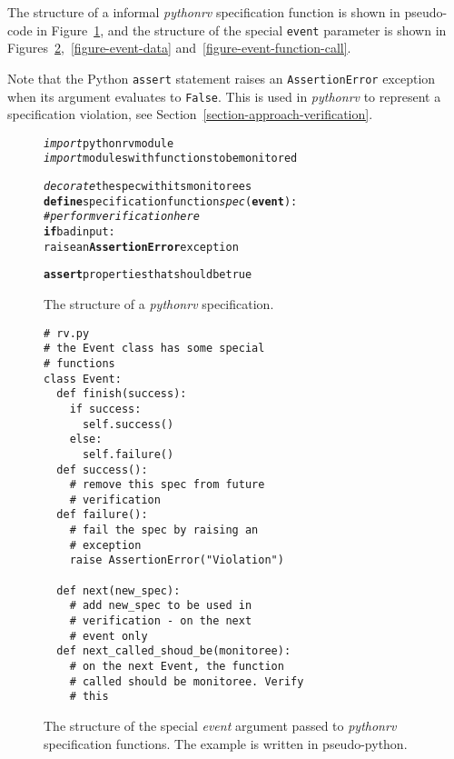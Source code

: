 The structure of a informal \textit{pythonrv} specification function is shown
in pseudo-code in Figure~\ref{figure-pseudo-spec}, and the structure of the
special \texttt{event} parameter is shown in
Figures~\ref{figure-event-functions},~\ref{figure-event-data}
and~\ref{figure-event-function-call}.

Note that the Python \texttt{assert} statement raises an
\texttt{AssertionError} exception when its argument evaluates to
\texttt{False}. This is used in \textit{pythonrv} to represent a specification
violation, see Section~\ref{section-approach-verification}.

\begin{figure}[h!]
	\begin{center}
	\begin{minipage}{0.7\textwidth}
    \begin{alltt}
\emph{import} pythonrv module
\emph{import} modules with functions to be monitored

\emph{decorate} the spec with its monitorees
\textbf{define} specification function \textit{spec}(\textbf{event}):
  \textit{# perform verification here}
  \textbf{if} bad input:
    raise an \textbf{AssertionError} exception

  \textbf{assert} properties that should be true
    \end{alltt}
	\end{minipage}
	\end{center}

  \caption{The structure of a \textit{pythonrv} specification.}
	\label{figure-pseudo-spec}
\end{figure}

\begin{figure}[h!]
	\begin{center}
	\begin{minipage}{0.7\textwidth}
	\begin{lstlisting}
# rv.py
# the Event class has some special
# functions
class Event:
  def finish(success):
    if success:
      self.success()
    else:
      self.failure()
  def success():
    # remove this spec from future
    # verification
  def failure():
    # fail the spec by raising an
    # exception
    raise AssertionError("Violation")

  def next(new_spec):
    # add new_spec to be used in
    # verification - on the next
    # event only
  def next_called_shoud_be(monitoree):
    # on the next Event, the function
    # called should be monitoree. Verify
    # this
	\end{lstlisting}
	\end{minipage}
	\end{center}

  \caption{The structure of the special \textit{event} argument passed to
    \textit{pythonrv} specification functions. The example is written in
    pseudo-python.}
	\label{figure-event-functions}
\end{figure}

